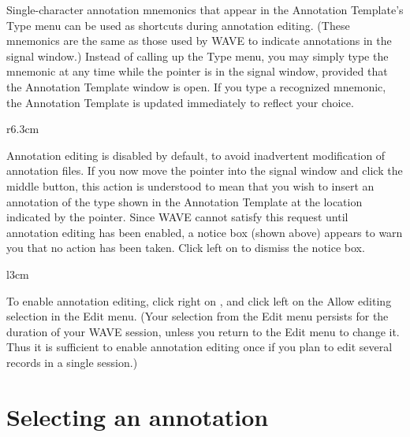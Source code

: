 \documentclass[twoside]{book}
\newcommand{\button}[1]{\cornersize{2}\ovalbox{\rule[-.3mm]{0cm}{2.5mm}\small\sf ~#1~}}
\newcommand{\menubutton}[1]{\button{#1~\ensuremath{\nabla}}}
\newcommand{\WAVE}{{\sf WAVE}\xspace}
\begin{document}
Single-character annotation mnemonics
that appear in the {\sf Annotation Template}'s {\sf Type} menu
can be used as shortcuts 
during annotation editing.  (These mnemonics are the same as those used by
\WAVE{} to indicate annotations in the signal window.)  Instead of
calling up the {\sf Type} menu, you may
simply type the mnemonic at any time while the pointer is in the
signal window, provided that the {\sf Annotation Template} window is open.
If you type a recognized mnemonic, the {\sf Annotation Template} is updated
immediately to reflect your choice.

\begin{latexonly}
\newpage
\end{latexonly}
\begin{wrapfigure}[8]{r}{6.3cm}
\mbox{}
\end{wrapfigure}
Annotation editing is disabled by default, to avoid inadvertent modification of
annotation files.  If you now move the pointer into the signal window and click
the middle button, this action is understood to mean that you wish to insert an
annotation of the type shown in the {\sf Annotation Template} at the location
indicated by the pointer.  Since \WAVE{} cannot satisfy this request until
annotation editing has been enabled, a notice box (shown above) appears to warn
you that no action has been taken.  Click left on \button{Continue} to dismiss
the notice box.

\begin{wrapfigure}{l}{3cm}
\mbox{}
\begin{htmlonly}
\end{htmlonly}
\begin{latexonly}
\end{latexonly}
\end{wrapfigure}
To enable annotation editing, click right on \menubutton{Edit},
and click left on the {\sf Allow editing} selection in the {\sf Edit}
menu.  (Your selection from the {\sf Edit} menu persists for the duration of
your {\sf WAVE} session, unless you return to the {\sf Edit} menu to change
it.  Thus it is sufficient to enable annotation editing once if you plan to
edit several records in a single session.)

\section{Selecting an annotation}
\label{sec:selecting-annotation}
\end{document}
